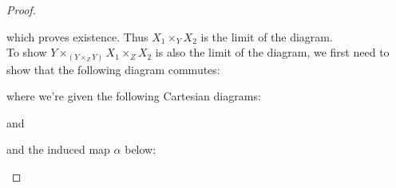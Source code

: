 \documentclass{article}
\newcommand{\id}{\mathrm{id}}
\begin{document}
\begin{proof}
\begin{center}
    \end{center}
    which proves existence. Thus $X_1\times_Y X_2$ is the limit of the diagram.\\
    \newline
    To show $Y\times_{(Y\times_ZY)}X_1\times_Z X_2$ is also the limit of the diagram, we first need to show that the following diagram commutes:
    \begin{center}
    \end{center}
    where we're given the following Cartesian diagrams:
    \begin{center}
    \end{center}
    and
    \begin{center}
    \end{center}
    and the induced map $\alpha$ below:
\begin{center}
\end{center}
\end{proof}
\end{document}
